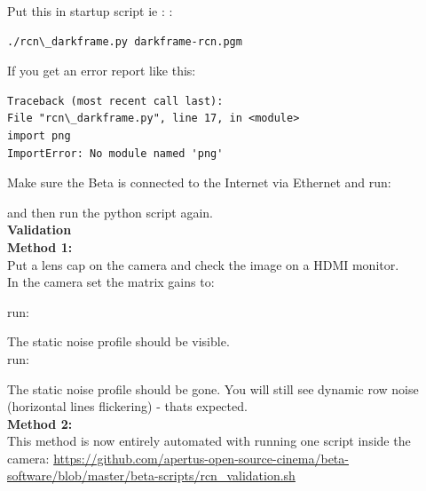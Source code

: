 Put this in startup script ie :  :

\begin{lstlisting}[breaklines=true, breakatwhitespace=true]
./rcn\_darkframe.py darkframe-rcn.pgm 
\end{lstlisting} 

If you get an error report like this: 

\begin{lstlisting}[breaklines=true, breakatwhitespace=true]
Traceback (most recent call last):
File "rcn\_darkframe.py", line 17, in <module>
import png
ImportError: No module named 'png'
\end{lstlisting} 

Make sure the Beta is connected to the Internet via Ethernet and run: 


and then run the python script again.\\

\textbf{Validation}\\

\textbf{Method 1:}\\
	
Put a lens cap on the camera and check the image on a HDMI monitor.\\

In the camera set the matrix gains to: 


run:


The static noise profile should be visible.\\

run: 


The static noise profile should be gone. You will still see dynamic row noise (horizontal lines flickering) - thats expected.\\


\textbf{Method 2:}\\

This method is now entirely automated with running one script inside the camera: \href{https://github.com/apertus-open-source-cinema/beta-software/blob/master/beta-scripts/rcn_validation.sh}{https://github.com/apertus-open-source-cinema/beta-software/blob/master/beta-scripts/rcn\_validation.sh}\\

